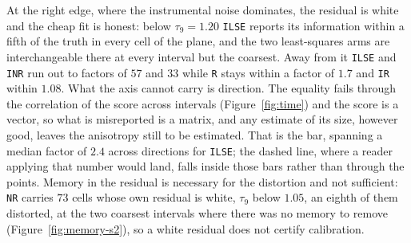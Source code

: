 At the right edge, where the instrumental noise dominates, the residual is white and the cheap fit
is honest: below $\tau_{9} = 1.20$ \texttt{ILSE} reports its information within a fifth of
the truth in every cell of the plane, and the two least-squares arms are interchangeable there at every
interval but the coarsest.
Away from it \texttt{ILSE} and \texttt{INR} run out to factors of $57$ and $33$ while \texttt{R}
stays within a factor of $1.7$ and \texttt{IR} within $1.08$. What the axis cannot carry is direction. The
equality fails through the correlation of the score across intervals (Figure~\ref{fig:time}) and
the score is a vector, so what is misreported is a matrix, and any estimate of its size, however
good, leaves the anisotropy still to be estimated. That is the bar, spanning a median factor of
$2.4$ across directions for \texttt{ILSE}; the dashed line, where a reader applying that number
would land, falls inside those bars rather than through the points.
Memory in the residual is necessary for the distortion and not sufficient: \texttt{NR} carries $73$
cells whose own residual is white, $\tau_{9}$ below $1.05$, an eighth of them distorted, at the two
coarsest intervals where there was no memory to remove (Figure~\ref{fig:memory-s2}),
so a white residual
does not certify calibration.

